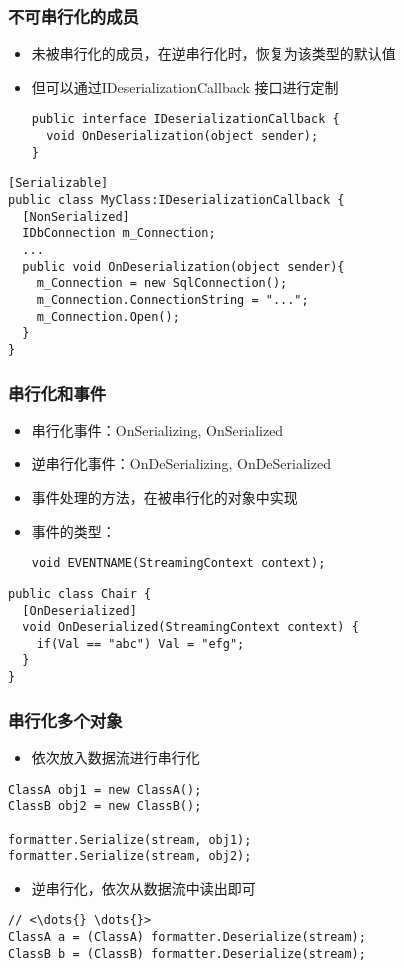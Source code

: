 \begin{frame}[fragile]
\frametitle{不可串行化的成员}
\begin{itemize}
\item 未被串行化的成员，在逆串行化时，恢复为该类型的默认值
\item 但可以通过IDeserializationCallback 接口进行定制
\begin{lstlisting}
public interface IDeserializationCallback {
  void OnDeserialization(object sender);
}
\end{lstlisting}
\end{itemize}
\begin{lstlisting}
[Serializable]
public class MyClass:IDeserializationCallback {
  [NonSerialized]
  IDbConnection m_Connection;
  ...
  public void OnDeserialization(object sender){
    m_Connection = new SqlConnection();
    m_Connection.ConnectionString = "...";
    m_Connection.Open();
  }
}
\end{lstlisting}
\end{frame}

\begin{frame}[fragile]
\frametitle{串行化和事件}
\begin{itemize}
\item 串行化事件：OnSerializing, OnSerialized
\item 逆串行化事件：OnDeSerializing, OnDeSerialized
\item 事件处理的方法，在被串行化的对象中实现
\item 事件的类型：
\begin{lstlisting}
void EVENTNAME(StreamingContext context);
\end{lstlisting}
\end{itemize}
\begin{lstlisting}
public class Chair {
  [OnDeserialized]
  void OnDeserialized(StreamingContext context) {
    if(Val == "abc") Val = "efg";
  }
}
\end{lstlisting}
\end{frame}

\begin{frame}[fragile]
\frametitle{串行化多个对象}
\begin{itemize}
\item 依次放入数据流进行串行化
\end{itemize}
\begin{lstlisting}
ClassA obj1 = new ClassA();
ClassB obj2 = new ClassB();

formatter.Serialize(stream, obj1);
formatter.Serialize(stream, obj2);

\end{lstlisting}
\begin{itemize}
\item 逆串行化，依次从数据流中读出即可
\end{itemize}
\begin{lstlisting}[escapeinside=<>]
// <\dots{} \dots{}>
ClassA a = (ClassA) formatter.Deserialize(stream);
ClassB b = (ClassB) formatter.Deserialize(stream);
\end{lstlisting}
\end{frame}

